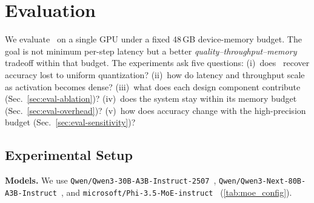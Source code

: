 \section{Evaluation}

We evaluate \systemname\ on a single GPU under a fixed 48\,GB device-memory budget. The goal is not minimum per-step latency but a better \emph{quality--throughput--memory} tradeoff within that budget. The experiments ask five questions: (i)~does \systemname\ recover accuracy lost to uniform quantization? (ii)~how do latency and throughput scale as activation becomes dense? (iii)~what does each design component contribute (Sec.~\ref{sec:eval-ablation})? (iv)~does the system stay within its memory budget (Sec.~\ref{sec:eval-overhead})? (v)~how does accuracy change with the high-precision budget (Sec.~\ref{sec:eval-sensitivity})?

\subsection{Experimental Setup}
\label{sec:eval-setup}

\begin{table}[t]
  \centering
  \caption{Configuration of evaluated MoE models.}
  \label{tab:moe_config}
  \vspace{-0.5em}
  \setlength{\tabcolsep}{4pt}
\end{table}

\noindent\textbf{Models.}
We use \nolinkurl{Qwen/Qwen3-30B-A3B-Instruct-2507}~\cite{qwen3technicalreport}, \nolinkurl{Qwen/Qwen3-Next-80B-A3B-Instruct}~\cite{qwen3nextmodelcard}, and \nolinkurl{microsoft/Phi-3.5-MoE-instruct}~\cite{abdin2024phi3} (\autoref{tab:moe_config}).

